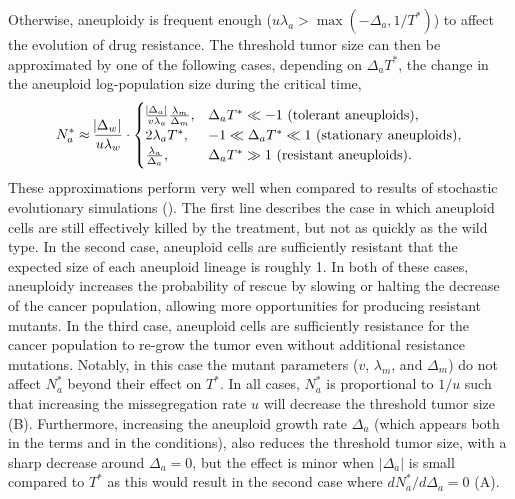 \documentclass[12pt]{extarticle}
\begin{document}
Otherwise, aneuploidy is frequent enough ($u\lambda_a > \max{\left(-\Delta_a, 1/T^*\right)}$) to affect the evolution of drug resistance. 
The threshold tumor size can then be approximated by one of the following cases, depending on $\Delta_a T^*$, the change in the aneuploid log-population size during the critical time,
\begin{equation}  \label{eq:N_a}
\begin{aligned}
N_a^* \approx 
  \frac{\abs{\Delta_w}}{u\lambda_w} \cdot \begin{cases}
    \frac{\abs{\Delta_a}}{v\lambda_a}  \frac{\lambda_m}{\Delta_m} ,&
  \Delta_a T^* \ll -1 \text{ (tolerant aneuploids)},\\ 
  2\lambda_a T^* ,&
  -1 \ll \Delta_a T^* \ll 1  \text{ (stationary aneuploids)},\\ 
  \frac{\lambda_a}{\Delta_a} ,&
   \Delta_a T^* \gg 1 \text{ (resistant aneuploids)}.
  \end{cases}
\end{aligned}
\end{equation}
These approximations perform very well when compared to results of stochastic evolutionary simulations ().
The first line describes the case in which aneuploid cells are still effectively killed by the treatment, but not as quickly as the wild type. 
In the second case, aneuploid cells are sufficiently resistant that the expected size of each aneuploid lineage is roughly 1.
In both of these cases, aneuploidy increases the probability of rescue by slowing or halting the decrease of the cancer population, allowing more opportunities for producing resistant mutants. 
In the third case, aneuploid cells are sufficiently resistance for the cancer population to re-grow the tumor even without additional resistance mutations.
Notably, in this case the mutant parameters ($v$, $\lambda_m$, and $\Delta_m$) do not affect $N_a^*$ beyond their effect on $T^*$.
In all cases, $N_a^*$ is proportional to $1/u$ such that increasing the missegregation rate $u$ will decrease the threshold tumor size (B).
Furthermore, increasing the aneuploid growth rate $\Delta_a$ (which appears both in the terms and in the conditions), also reduces the threshold tumor size, with a sharp decrease around $\Delta_a=0$, but the effect is minor when $|\Delta_a|$ is small compared to $T^*$ as this would result in the second case where  $dN_a^*/d\Delta_a=0$ (A). %
\end{document}
